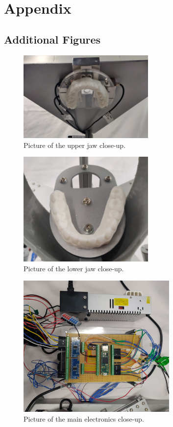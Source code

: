 \section{Appendix}

\subsection{Additional Figures}
\label{sec:appendix_figures}

\begin{figure}[H]
    \centering
    \includegraphics[width=0.6\textwidth]{figures/upper_jaw_close_up.jpg}
    \caption{Picture of the upper jaw close-up.}
    \label{fig:pic_upper_jaw_close_up}
\end{figure}

\begin{figure}[H]
    \centering
    \includegraphics[width=0.6\textwidth]{figures/lower_jaw_close_up.jpg}
    \caption{Picture of the lower jaw close-up.}
    \label{fig:pic_lower_jaw_close_up}
\end{figure}

\begin{figure}[H]
    \centering
    \includegraphics[width=0.7\textwidth]{figures/elec_close_up.jpg}
    \caption{Picture of the main electronics close-up.}
    \label{fig:pic_elec_close_up}
\end{figure}